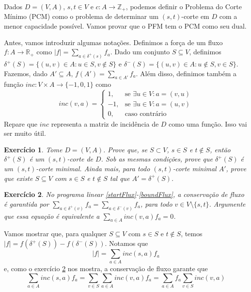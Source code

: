 \documentclass[]{article}
\newtheorem{exercicio}{Exercício}
\numberwithin{equation}{section}
\begin{document}
Dados $D = (V, A)$, $s, t \in V$ e $c : A \to \mathbb{Z}_+$, podemos definir o Problema do Corte Mínimo
(PCM) como o problema de determinar um $(s, t)$-corte em $D$ com a menor capacidade possível.
Vamos provar que o PFM tem o PCM como seu dual.

Antes, vamos introduzir algumas notações.
Definimos a força de um fluxo $f : A \to \mathbb{R}_+$ como $|f| = \sum_{a \in \delta^+(s)} f_a$.
Dado um conjunto $S \subseteq V$, definimos $\delta^+(S) = \{(u, v) \in A : u \in S, v \notin S\}$ e $\delta^-(S) = \{(u, v) \in A : u \notin S, v \in S\}$.
Fazemos, dado $A' \subseteq A$, $f(A') = \sum_{a \in A'} f_a$.
Além disso, definimos também a função $inc : V \times A \to \{-1, 0, 1\}$ como
$$
inc(v, a) =
\begin{cases}
  1,  & \text{se } \exists u \in V : a = (v, u)  \\
  -1, & \text{se } \exists u \in V : a = (u, v) \\
  0,  & \text{caso contrário}
\end{cases}
$$
Repare que $inc$ representa a matriz de incidência de $D$ como uma função.
Isso vai ser muito útil.

\begin{exercicio}
  Tome $D = (V, A)$.
  Prove que, se $S \subset V$, $s \in S$ e $t \notin S$, então $\delta^+(S)$ é um $(s, t)$-corte de $D$.
  Sob as mesmas condições, prove que $\delta^+(S)$ é um $(s, t)$-corte minimal.
  Ainda mais, para todo $(s, t)$-corte minimal $A'$, prove que existe $S \subseteq V$
  com $s \in S$ e $t \notin S$ tal que $A' = \delta^+(S)$.
\end{exercicio}

\begin{exercicio} \label{exerciseEquivalenceConservation}
  No programa linear \eqref{startFlux}-\eqref{boundFlux}, a conservação de fluxo é garantida por
  $\sum_{a \in \delta^+(v)} f_a = \sum_{a \in \delta^-(v)} f_a$, para todo $v \in V \setminus \{s, t\}$.
  Argumente que essa equação é equivalente a $\sum_{a \in A} inc(v, a) f_a = 0$.
\end{exercicio}

Vamos mostrar que, para qualquer $S \subseteq V$ com $s \in S$ e $t \notin S$, temos
$|f| = f(\delta^+(S)) - f(\delta^-(S))$.
Notamos que
$$
|f| = \sum_{a \in A} inc(s, a) f_a
$$
e, como o exercício \ref{exerciseEquivalenceConservation} nos mostra, a conservação
de fluxo garante que
$$
\sum_{a \in A} inc(s, a) f_a = \sum_{v \in S} \sum_{a \in A} inc(v, a) f_a =
\sum_{a \in A} f_a \sum_{v \in S} inc(v, a)
$$
\end{document}
